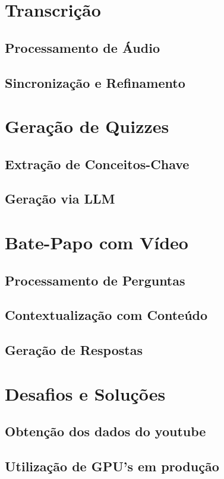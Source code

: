 \documentclass[tcc,capa]{texufpel}
\begin{document}
\section{Transcrição}
\subsection{Processamento de Áudio}
\subsection{Sincronização e Refinamento}

\section{Geração de Quizzes}
\subsection{Extração de Conceitos-Chave}
\subsection{Geração via LLM}

\section{Bate-Papo com Vídeo}
\subsection{Processamento de Perguntas}
\subsection{Contextualização com Conteúdo}
\subsection{Geração de Respostas}

\section{Desafios e Soluções}
\subsection{Obtenção dos dados do youtube}
\subsection{Utilização de GPU's em produção}
\end{document}
